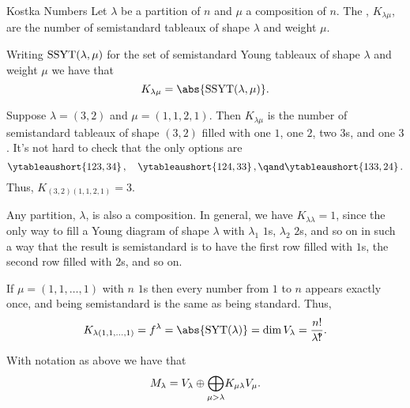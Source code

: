 \begin{dfn}{Kostka Numbers}{}
    Let \(\lambda\) be a partition of \(n\) and \(\mu\) a composition of \(n\).
    The , \(K_{\lambda\mu}\), are the number of semistandard tableaux of shape \(\lambda\) and weight \(\mu\).
\end{dfn}

Writing \(\operatorname{SSYT}(\lambda, \mu)\) for the set of semistandard Young tableaux of shape \(\lambda\) and weight \(\mu\) we have that
\begin{equation}
    K_{\lambda\mu} = \abs{\semistandardYoungTableaux(\lambda, \mu)}.
\end{equation}

\begin{exm}{}{}
    Suppose \(\lambda = (3, 2)\) and \(\mu = (1, 1, 2, 1)\).
    Then \(K_{\lambda\mu}\) is the number of semistandard tableaux of shape \((3, 2)\) filled with one \(1\), one \(2\), two \(3\)s, and one \(3\).
    It's not hard to check that the only options are
    \begin{equation}
        \ytableaushort{123,34}\,,\quad \ytableaushort{124,33}\,,\qand \ytableaushort{133,24}\,.
    \end{equation}
    Thus, \(K_{(3,2)(1,1,2,1)} = 3\).
    
    Any partition, \(\lambda\), is also a composition.
    In general, we have \(K_{\lambda\lambda} = 1\), since the only way to fill a Young diagram of shape \(\lambda\) with \(\lambda_1\) \(1\)s, \(\lambda_2\) \(2\)s, and so on in such a way that the result is semistandard is to have the first row filled with \(1\)s, the second row filled with \(2\)s, and so on.
    
    If \(\mu = (1, 1, \dotsc, 1)\) with \(n\) \(1\)s then every number from \(1\) to \(n\) appears exactly once, and being semistandard is the same as being standard.
    Thus,
    \begin{equation}
        K_{\lambda(1, 1, \dotsc, 1)} = f^\lambda = \abs{\standardYoungTableaux(\lambda)} = \dim V_\lambda = \frac{n!}{\lambda \intterobang}.
    \end{equation}
\end{exm}

\begin{prp}{}{}
    With notation as above we have that
    \begin{equation}
        M_\lambda = V_\lambda \oplus \vphantom{\bigoplus}\smash{\bigoplus_{\mu > \lambda}} K_{\mu\lambda} V_\mu.
    \end{equation}
\end{prp}

